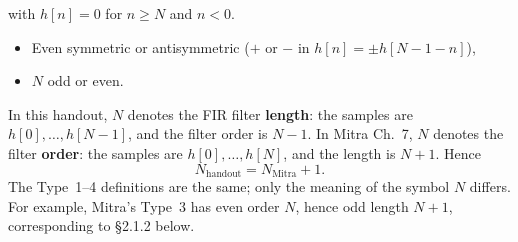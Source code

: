\documentclass[handout_subfiles_root.tex]{subfiles}
\begin{document}
\noindent with $h[n]=0$ for $n\ge N$ and $n<0$.


\begin{itemize}
  \item Even symmetric or antisymmetric ($+$ or $-$ in $h[n] = \pm h[N-1-n]$),
  \item $N$ odd or even.
\end{itemize}

\begin{notebox}[title={Notation: this handout vs.\ Mitra}]
In this handout, $N$ denotes the FIR filter \textbf{length}: the samples are
$h[0],\ldots,h[N-1]$, and the filter order is $N-1$.
In Mitra Ch.~7, $N$ denotes the filter \textbf{order}: the samples are
$h[0],\ldots,h[N]$, and the length is $N+1$. Hence
\begin{equation*}
N_{\text{handout}}=N_{\text{Mitra}}+1.
\end{equation*}
The Type~1--4 definitions are the same; only the meaning of the symbol $N$
differs. For example, Mitra's Type~3 has even order $N$, hence odd length
$N+1$, corresponding to §2.1.2 below.
\end{notebox}
\end{document}
